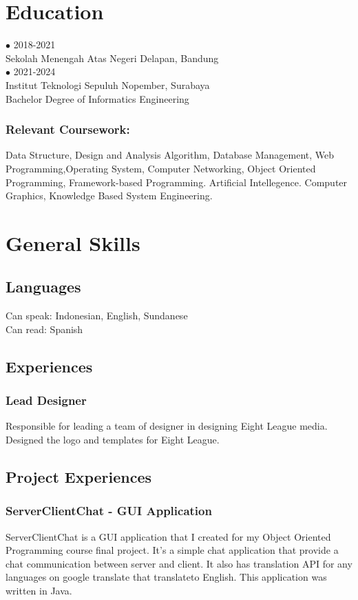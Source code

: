 \documentclass{article}
\begin{document}
\section{Education}
{\Large $ \bullet $ 2018-2021} \\
{Sekolah Menengah Atas Negeri Delapan, Bandung}
\\[2em]
{\Large $ \bullet $ 2021-2024} \\
{Institut Teknologi Sepuluh Nopember, Surabaya}
\\
{Bachelor Degree of Informatics Engineering}
\subsubsection{Relevant Coursework:}
Data Structure, Design and Analysis Algorithm, Database Management, Web Programming,Operating System, Computer Networking, Object Oriented Programming, Framework-based Programming. Artificial Intellegence. Computer Graphics, Knowledge Based System Engineering.

\section{General Skills}

\subsection{Languages}
Can speak: Indonesian, English, Sundanese \\
Can read: Spanish 

\subsection{Experiences}
\subsubsection{Lead Designer}
Responsible for leading a team of designer in designing Eight League media. Designed the logo and templates for Eight League.

\subsection{Project Experiences}
\subsubsection{ServerClientChat - GUI Application}
ServerClientChat is a GUI application that I created for my Object Oriented Programming course final project. It's a simple chat application 
that provide a chat communication between server and client. It also has translation API for any languages on google translate that translateto English. This application was written in Java.
\end{document}
